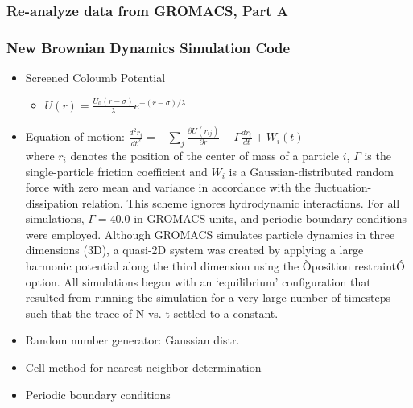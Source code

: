 \documentclass[11pt]{article}
\begin{document}
\subsubsection{Re-analyze data from GROMACS, Part A}
\label{sec-3-2-1}
\subsubsection{New Brownian Dynamics Simulation Code}
\label{sec-3-2-2}
\begin{itemize}

\item Screened Coloumb Potential
\label{sec-3-2-2-1}%
\begin{itemize}

\item $U(r)=\frac{U_0 (r-\sigma)}{\lambda} e^{-(r-\sigma)/\lambda}$\\
\label{sec-3-2-2-1-1}%
\end{itemize} %

\item Equation of motion: $\frac{d^2 r_i}{dt^2}  = - \sum_j \frac{\partial{U(r_{ij})}}{{\partial r}}  - \Gamma  \frac{d r_i}{dt} + W_i (t)$\\
\label{sec-3-2-2-2}%
where $r_i$ denotes the position of the center of mass of a particle $i$, $\Gamma$ is the single-particle friction coefficient and $W_i$ is a Gaussian-distributed random force with zero mean and variance in accordance with the fluctuation-dissipation relation.  This scheme ignores hydrodynamic interactions. For all simulations, $\Gamma=40.0$ in GROMACS units, and periodic boundary conditions were employed. Although GROMACS simulates particle dynamics in three dimensions (3D), a quasi-2D system was created by applying a large harmonic potential along the third dimension using the Òposition restraintÓ option. All simulations began with an `equilibrium' configuration that resulted from running the simulation for a very large number of timesteps such that the trace of N vs. t settled to a constant.

\item Random number generator: Gaussian distr.\\
\label{sec-3-2-2-3}%
\item Cell method for nearest neighbor determination\\
\label{sec-3-2-2-4}%
\item Periodic boundary conditions\\
\label{sec-3-2-2-5}%
\end{itemize} %
\end{document}

